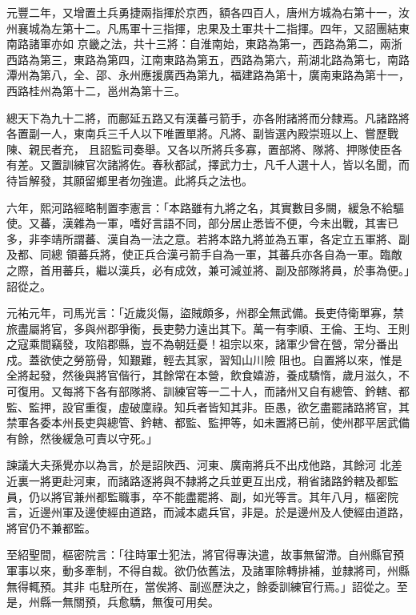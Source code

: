 \begin{pinyinscope}
 元豐二年，又增置土兵勇捷兩指揮於京西，額各四百人，唐州方城為右第十一，汝州襄城為左第十二。凡馬軍十三指揮，忠果及土軍共十二指揮。四年，又詔團結東南路諸軍亦如
 京畿之法，共十三將：自淮南始，東路為第一，西路為第二，兩浙西路為第三，東路為第四，江南東路為第五，西路為第六，荊湖北路為第七，南路潭州為第八，全、邵、永州應援廣西為第九，福建路為第十，廣南東路為第十一，西路桂州為第十二，邕州為第十三。



 總天下為九十二將，而鄜延五路又有漢蕃弓箭手，亦各附諸將而分隸焉。凡諸路將各置副一人，東南兵三千人以下唯置單將。凡將、副皆選內殿崇班以上、嘗歷戰陳、親民者充，
 且詔監司奏舉。又各以所將兵多寡，置部將、隊將、押隊使臣各有差。又置訓練官次諸將佐。春秋都試，擇武力士，凡千人選十人，皆以名聞，而待旨解發，其願留鄉里者勿強遣。此將兵之法也。



 六年，熙河路經略制置李憲言：「本路雖有九將之名，其實數目多闕，緩急不給驅使。又蕃，漢雜為一軍，嗜好言語不同，部分居止悉皆不便，今未出戰，其害已多，非李靖所謂蕃、漢自為一法之意。若將本路九將並為五軍，各定立五軍將、副及都、同總
 領蕃兵將，使正兵合漢弓箭手自為一軍，其蕃兵亦各自為一軍。臨敵之際，首用蕃兵，繼以漢兵，必有成效，兼可減並將、副及部隊將員，於事為便。」詔從之。



 元祐元年，司馬光言：「近歲災傷，盜賊頗多，州郡全無武備。長吏侍衛單寡，禁旅盡屬將官，多與州郡爭衡，長吏勢力遠出其下。萬一有李順、王倫、王均、王則之寇乘間竊發，攻陷郡縣，豈不為朝廷憂！祖宗以來，諸軍少曾在營，常分番出戍。蓋欲使之勞筋骨，知艱難，輕去其家，習知山川險
 阻也。自置將以來，惟是全將起發，然後與將官偕行，其餘常在本營，飲食嬉游，養成驕惰，歲月滋久，不可復用。又每將下各有部隊將、訓練官等一二十人，而諸州又自有總管、鈐轄、都監、監押，設官重復，虛破廩祿。知兵者皆知其非。臣愚，欲乞盡罷諸路將官，其禁軍各委本州長吏與總管、鈐轄、都監、監押等，如未置將已前，使州郡平居武備有餘，然後緩急可責以守死。」



 諫議大夫孫覺亦以為言，於是詔陜西、河東、廣南將兵不出戍他路，其餘河
 北差近裏一將更赴河東，而諸路逐將與不隸將之兵並更互出戍，稍省諸路鈐轄及都監員，仍以將官兼州都監職事，卒不能盡罷將、副，如光等言。其年八月，樞密院言，近邊州軍及邊使經由道路，而減本處兵官，非是。於是邊州及人使經由道路，將官仍不兼都監。



 至紹聖間，樞密院言：「往時軍士犯法，將官得專決遣，故事無留滯。自州縣官預軍事以來，動多牽制，不得自裁。欲仍依舊法，及諸軍除轉排補，並隸將司，州縣無得輒預。其非
 屯駐所在，當俟將、副巡歷決之，餘委訓練官行焉。」詔從之。至是，州縣一無關預，兵愈驕，無復可用矣。




\end{pinyinscope}
